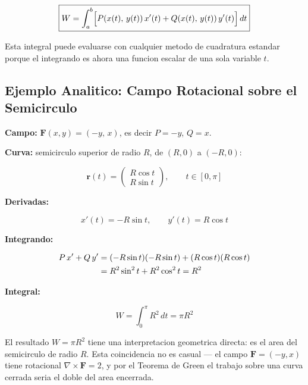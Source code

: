 \documentclass[12pt,a4paper]{article}
\begin{document}
\begin{equation}
\boxed{
    W = \int_a^b \Bigl[ P(x(t),\,y(t))\,x'(t)
                      + Q(x(t),\,y(t))\,y'(t) \Bigr]\, dt
}
\label{eq:param_integral}
\end{equation}

Esta integral puede evaluarse con cualquier metodo de cuadratura estandar
porque el integrando es ahora una funcion escalar de una sola variable $t$.

\subsection{Ejemplo Analitico: Campo Rotacional sobre el Semicirculo}

\textbf{Campo:} $\mathbf{F}(x,y) = (-y,\, x)$, es decir $P = -y$, $Q = x$.

\textbf{Curva:} semicirculo superior de radio $R$, de $(R,0)$ a $(-R,0)$:

\begin{equation}
    \mathbf{r}(t) = \begin{pmatrix} R\cos t \\ R\sin t \end{pmatrix},
    \qquad t \in [0, \pi]
\end{equation}

\textbf{Derivadas:}

\begin{equation}
    x'(t) = -R\sin t, \qquad y'(t) = R\cos t
\end{equation}

\textbf{Integrando:}

\begin{align}
    P\,x' + Q\,y'
    &= (-R\sin t)(-R\sin t) + (R\cos t)(R\cos t) \notag \\
    &= R^2\sin^2 t + R^2\cos^2 t = R^2
\end{align}

\textbf{Integral:}

\begin{equation}
    W = \int_0^\pi R^2\, dt = \pi R^2
    \label{eq:sol_analitica}
\end{equation}

El resultado $W = \pi R^2$ tiene una interpretacion geometrica directa:
es el area del semicirculo de radio $R$. Esta coincidencia no es casual ---
el campo $\mathbf{F} = (-y, x)$ tiene rotacional $\nabla\times\mathbf{F} = 2$,
y por el Teorema de Green el trabajo sobre una curva cerrada seria el doble
del area encerrada.
\end{document}
